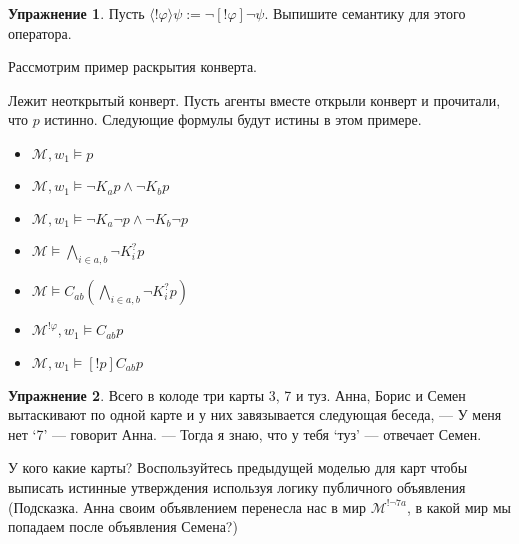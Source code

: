 \documentclass[openany]{book}
\theoremstyle{plain}
\theoremstyle{definition}
\newtheorem{xrc}{Упражнение}[]
\begin{document}
\begin{xrc}
Пусть \(\langle ! \varphi \rangle \psi := \neg [!\varphi] \neg \psi\). Выпишите семантику для этого оператора.
\end{xrc}

Рассмотрим пример раскрытия конверта.

Лежит неоткрытый конверт. Пусть агенты вместе открыли конверт и прочитали, что \(p\) истинно. Следующие формулы будут истины в этом примере. 
\begin{itemize}
\item \(\mathcal{M}, w_1 \models p\)
\item \(\mathcal{M}, w_1 \models \neg K_a p \land \neg K_b p\)
\item \(\mathcal{M}, w_1 \models \neg K_a \neg p \land \neg K_b \neg p\)
\item \(\mathcal{M} \models \bigwedge\limits_{i\in{a,b}} \neg K_i^? p\)
\item \(\mathcal{M} \models C_{ab} \left(\bigwedge\limits_{i \in {a,b}} \neg K_i^? p \right)\)
\item \(\mathcal{M}^{!\varphi}, w_1 \models C_{ab} p\)
\item \(\mathcal{M}, w_1 \models [!p] C_{ab} p\)
\end{itemize}

\begin{xrc}
Всего в колоде три карты 3, 7 и туз. Анна, Борис и Семен вытаскивают по одной карте и у них завязывается следующая беседа,
--- У меня нет `7' --- говорит Анна.
--- Тогда я знаю, что у тебя `туз' --- отвечает Семен.

У кого какие карты? Воспользуйтесь предыдущей моделью для карт чтобы выписать истинные утверждения используя логику публичного объявления (Подсказка. Анна своим объявлением перенесла нас в мир \(\mathcal{M}^{! \neg 7a}\), в какой мир мы попадаем после объявления Семена?)
\end{xrc}
\end{document}
